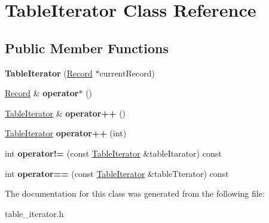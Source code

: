 \hypertarget{class_table_iterator}{}\section{Table\+Iterator Class Reference}
\label{class_table_iterator}
\subsection*{Public Member Functions}
\begin{DoxyCompactItemize}
\item 
\hypertarget{class_table_iterator_a0f308b7f879debb2c904b6bfac10a663}{}{\bfseries Table\+Iterator} (\hyperlink{struct_record}{Record} $\ast$current\+Record)\label{class_table_iterator_a0f308b7f879debb2c904b6bfac10a663}

\item 
\hypertarget{class_table_iterator_a4936bda5654819e458172819485bd6ab}{}\hyperlink{struct_record}{Record} \& {\bfseries operator$\ast$} ()\label{class_table_iterator_a4936bda5654819e458172819485bd6ab}

\item 
\hypertarget{class_table_iterator_ac35c71a476d3963253c3cedea51bcbbf}{}\hyperlink{class_table_iterator}{Table\+Iterator} \& {\bfseries operator++} ()\label{class_table_iterator_ac35c71a476d3963253c3cedea51bcbbf}

\item 
\hypertarget{class_table_iterator_a06880f5bc0dce10bc5204019f761f739}{}\hyperlink{class_table_iterator}{Table\+Iterator} {\bfseries operator++} (int)\label{class_table_iterator_a06880f5bc0dce10bc5204019f761f739}

\item 
\hypertarget{class_table_iterator_af52fe40df7ab5c15276bbefb7780352b}{}int {\bfseries operator!=} (const \hyperlink{class_table_iterator}{Table\+Iterator} \&table\+Itarator) const \label{class_table_iterator_af52fe40df7ab5c15276bbefb7780352b}

\item 
\hypertarget{class_table_iterator_a9cbd732fdf6da4594148e8d8746c83fc}{}int {\bfseries operator==} (const \hyperlink{class_table_iterator}{Table\+Iterator} \&table\+Tterator) const \label{class_table_iterator_a9cbd732fdf6da4594148e8d8746c83fc}

\end{DoxyCompactItemize}


The documentation for this class was generated from the following file\+:\begin{DoxyCompactItemize}
\item 
table\+\_\+iterator.\+h\end{DoxyCompactItemize}
